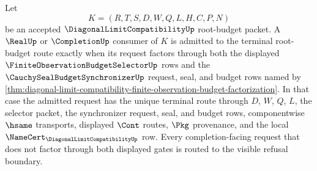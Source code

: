 \begin{theorem}
\label{thm:diagonal-limit-compatibility-selector-synchronizer-admission-criterion}
Let
$$
K=(R,T,S,D,W,Q,L,H,C,P,N)
$$
be an accepted $\DiagonalLimitCompatibilityUp$ root-budget packet. A $\RealUp$ or $\CompletionUp$ consumer of $K$ is admitted to the terminal root-budget route exactly when its request factors through both the displayed $\FiniteObservationBudgetSelectorUp$ rows and the $\CauchySealBudgetSynchronizerUp$ request, seal, and budget rows named by \autoref{thm:diagonal-limit-compatibility-finite-observation-budget-factorization}. In that case the admitted request has the unique terminal route through $D$, $W$, $Q$, $L$, the selector packet, the synchronizer request, seal, and budget rows, componentwise $\hsame$ transports, displayed $\Cont$ routes, $\Pkg$ provenance, and the local $\NameCert_{\DiagonalLimitCompatibilityUp}$ row. Every completion-facing request that does not factor through both displayed gates is routed to the visible refusal boundary.
\end{theorem}
